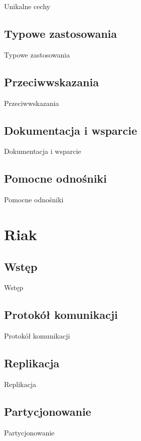 Unikalne cechy

\subsection*{Typowe zastosowania}

Typowe zastosowania

\subsection*{Przeciwwskazania}

Przeciwwskazania

\subsection*{Dokumentacja i wsparcie}

Dokumentacja i wsparcie

\subsection*{Pomocne odnośniki}
 
Pomocne odnośniki

\section{Riak}
\label{sec:riak}

\subsection*{Wstęp} 

Wstęp

\subsection*{Protokół komunikacji}

Protokół komunikacji

\subsection*{Replikacja}

Replikacja

\subsection*{Partycjonowanie}

Partycjonowanie

